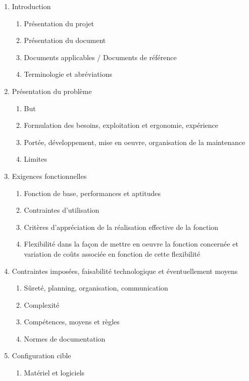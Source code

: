 {{\begin{enumerate}
      \item  Introduction
        \begin{enumerate}
          \item Présentation du projet
          \item Présentation du document 
          \item Documents applicables / Documents de référence
          \item Terminologie et abréviations
        \end{enumerate}  
      \item  Présentation du problème
        \begin{enumerate}
          \item But
          \item Formulation des besoins, exploitation et ergonomie, expérience 
          \item Portée, développement, mise en oeuvre, organisation de la maintenance
          \item Limites
        \end{enumerate} 
      \item  Exigences fonctionnelles
        \begin{enumerate}
          \item Fonction de base, performances et aptitudes
          \item Contraintes d'utilisation 
          \item Critères d'appréciation de la réalisation effective de la fonction
          \item Flexibilité dans la façon de mettre en oeuvre la fonction concernée et variation de coûts associée en fonction de cette flexibilité
        \end{enumerate} 
      \item Contraintes imposées, faisabilité technologique et éventuellement moyens
        \begin{enumerate}
          \item Sûreté, planning, organisation, communication
          \item Complexité 
          \item Compétences, moyens et règles
          \item Normes de documentation
        \end{enumerate} 
      \item  Configuration cible
        \begin{enumerate}
          \item Matériel et logiciels

\end{enumerate}
\end{enumerate}}}
